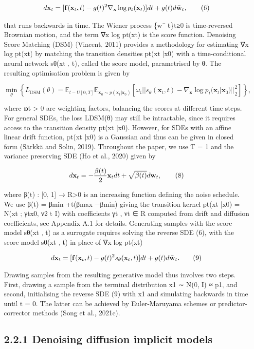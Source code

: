 \documentclass{article}
\begin{document}
$$d{\bf x}_{t}=[{\bf f}({\bf x}_{t},t)-g(t)^{2}\nabla_{\bf x}\log p_{t}({\bf x}_{t})]dt+g(t)d\bar{\bf w}_{t},\tag{6}$$

that runs backwards in time. The Wiener process \{w¯ t\}t≥0 is time-reversed Brownian motion, and the term ∇x log pt(xt) is the score function. Denoising Score Matching (DSM) (Vincent, 2011) provides a methodology for estimating ∇x log pt(xt) by matching the transition densities pt(xt |x0) with a time-conditional neural network sθ(xt , t), called the score model, parametrised by θ. The resulting optimisation problem is given by

$$\min_{\theta}\left\{L_{\text{DSM}}(\theta)=\mathbb{E}_{t-U[0,T]}\mathbb{E}_{\mathbf{x}_{0}\sim p(\mathbf{x}_{t}|\mathbf{x}_{0})}\left[\omega_{t}||s_{\theta}(\mathbf{x}_{t},t)-\nabla_{\mathbf{x}}\log p_{t}(\mathbf{x}_{t}|\mathbf{x}_{0})||_{2}^{2}\right]\right\},\tag{7}$$

where ωt > 0 are weighting factors, balancing the scores at different time steps. For general SDEs, the loss LDSM(θ) may still be intractable, since it requires access to the transition density pt(xt |x0). However, for SDEs with an affine linear drift function, pt(xt |x0) is a Gaussian and thus can be given in closed form (Särkkä and Solin, 2019). Throughout the paper, we use T = 1 and the variance preserving SDE (Ho et al., 2020) given by

$$d{\bf x}_{t}=-\frac{\beta(t)}{2}{\bf x}_{t}dt+\sqrt{\beta(t)}d{\bf w}_{t},\tag{8}$$

where β(t) : [0, 1] → R>0 is an increasing function defining the noise schedule. We use β(t) = βmin +t(βmax −βmin) giving the transition kernel pt(xt |x0) = N(xt ; γtx0, ν2 t I) with coefficients γt , νt ∈ R computed from drift and diffusion coefficients, see Appendix A.1 for details. Generating samples with the score model sθ(xt , t) as a surrogate requires solving the reverse SDE (6), with the score model sθ(xt , t) in place of ∇x log pt(xt)

$$d{\bf x}_{t}=[{\bf f}({\bf x}_{t},t)-g(t)^{2}s_{\theta}({\bf x}_{t},t)]dt+g(t)d\bar{\bf w}_{t}.\tag{9}$$

Drawing samples from the resulting generative model thus involves two steps. First, drawing a sample from the terminal distribution x1 ∼ N(0, I) ≈ p1, and second, initialising the reverse SDE (9) with x1 and simulating backwards in time until t = 0. The latter can be achieved by Euler-Maruyama schemes or predictor-corrector methods (Song et al., 2021c).

\subsection{2.2.1 Denoising diffusion implicit models}
\end{document}
